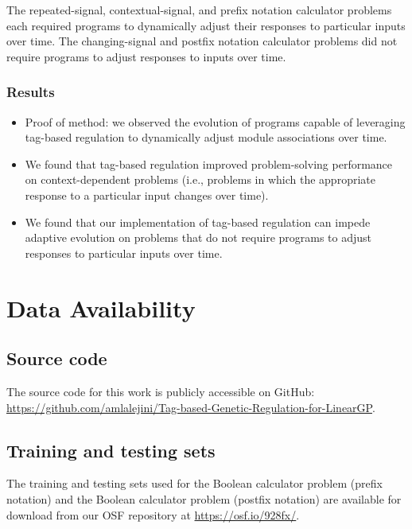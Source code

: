 \documentclass[
]{book}
\providecommand{\tightlist}{%
  \setlength{\itemsep}{0pt}\setlength{\parskip}{0pt}}
\begin{document}
The repeated-signal, contextual-signal, and prefix notation calculator problems each required programs to dynamically adjust their responses to particular inputs over time.
The changing-signal and postfix notation calculator problems did not require programs to adjust responses to inputs over time.

\hypertarget{results}{%
\subsection{Results}\label{results}}

\begin{itemize}
\tightlist
\item
  Proof of method: we observed the evolution of programs capable of leveraging tag-based regulation to dynamically adjust module associations over time.
\item
  We found that tag-based regulation improved problem-solving performance on context-dependent problems (i.e., problems in which the appropriate response to a particular input changes over time).
\item
  We found that our implementation of tag-based regulation can impede adaptive evolution on problems that do not require programs to adjust responses to particular inputs over time.
\end{itemize}

\hypertarget{data-availability}{%
\chapter{Data Availability}\label{data-availability}}

\hypertarget{source-code}{%
\section{Source code}\label{source-code}}

The source code for this work is publicly accessible on GitHub: \url{https://github.com/amlalejini/Tag-based-Genetic-Regulation-for-LinearGP}.

\hypertarget{training-and-testing-sets}{%
\section{Training and testing sets}\label{training-and-testing-sets}}

The training and testing sets used for the Boolean calculator problem (prefix notation) and the Boolean calculator problem (postfix notation) are available for download from our OSF repository \citep{Lalejini_Moreno_Ofria_Data_2020} at \url{https://osf.io/928fx/}.
\end{document}
